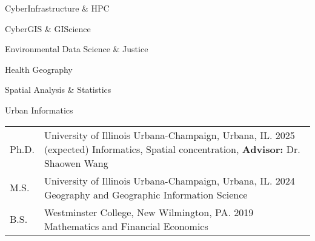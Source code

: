 \documentclass{acmcv}
\begin{document}
	\begin{multicols}{2}
		\begin{titemize}
			\item CyberInfrastructure \& HPC
			\item CyberGIS \& GIScience
			\item Environmental Data Science \& Justice
			\item Health Geography
			\item Spatial Analysis \& Statistics
            \item Urban Informatics
		\end{titemize}
	\end{multicols}


    \begin{longtable}{p{0.1\linewidth} p{0.9\linewidth}}
        Ph.D. & University of Illinois Urbana-Champaign, Urbana, IL. 2025 (expected) \newline Informatics, Spatial concentration, \textbf{Advisor:} Dr. Shaowen Wang \\

        M.S. & University of Illinois Urbana-Champaign, Urbana, IL. 2024 \newline Geography and Geographic Information Science\\

        B.S. & Westminster College, New Wilmington, PA. 2019 \newline Mathematics and Financial Economics\\
    \end{longtable}
    \vspace*{-0.25cm}

		\vspace{-.6cm}
        \nocite{*}
        \newrefcontext[labelprefix=R]
        \printbibliography[title={\normalsize Journal Articles Under Review}, type=article, keyword=inreview]
		\vspace{-.8cm}
        \newrefcontext[labelprefix=J]
		\printbibliography[title={\normalsize {Journal Articles}},type=article, keyword=journalarticle]
		\vspace{-.8cm}
        \newrefcontext[labelprefix=C]
		\printbibliography[title={\normalsize {Peer-Reviewed Conference Papers}},type=inproceedings, keyword=confpaper]
		\vspace{-.8cm}
        \newrefcontext[labelprefix=A]
        \printbibliography[title={\normalsize {Conference Abstracts}}, keyword=extabs]
	
\end{document}
